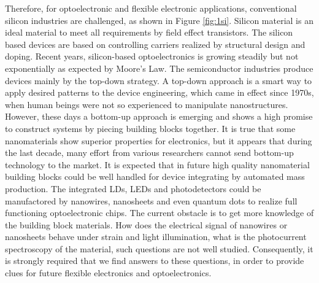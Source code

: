Therefore, for optoelectronic and flexible electronic applications, conventional silicon industries are challenged, as shown in Figure \ref{fig:1si}. Silicon material is an ideal material to meet all requirements by field effect transistors. The silicon based devices are based on controlling carriers realized by structural design and doping. Recent years, silicon-based optoelectronics is growing steadily but not exponentially as expected by Moore's Law. \cite{Waldrop2016} 
The semiconductor industries produce devices mainly by the top-down strategy. A top-down approach is a smart way to apply desired patterns to the device engineering, which came in effect since 1970s, when human beings were not so experienced to manipulate nanostructures. However, these days a bottom-up approach is emerging and shows a high promise to construct systems by piecing building blocks together. It is true that some nanomaterials show superior properties for electronics, but it appears that during the last decade, many effort from various researchers cannot send bottom-up technology to the market. It is expected that in future high quality nanomaterial building blocks could be well handled for device integrating by automated mass production. The integrated LDs, LEDs and photodetectors could be manufactored by nanowires, nanosheets and even quantum dots to realize full functioning optoelectronic chips. The current obstacle is to get more knowledge of the building block materials. How does the electrical signal of nanowires or nanosheets behave under strain and light illumination, what is the photocurrent spectroscopy of the material, such questions are not well studied. Consequently, it is strongly required that we find answers to these questions, in order to provide clues for future flexible electronics and optoelectronics. 

